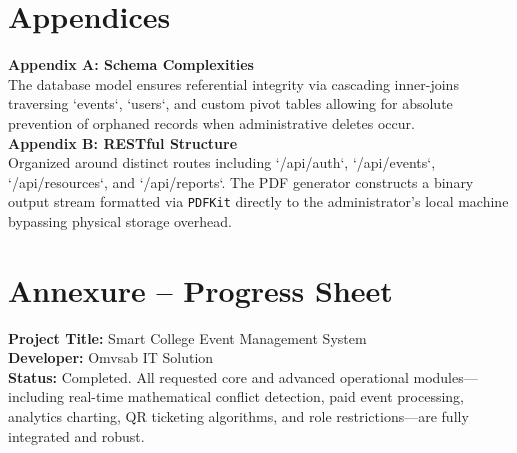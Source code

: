 \documentclass[12pt, a4paper]{report}
\begin{document}
\chapter{Appendices}
\noindent
\textbf{Appendix A: Schema Complexities} \\
The database model ensures referential integrity via cascading inner-joins traversing `events`, `users`, and custom pivot tables allowing for absolute prevention of orphaned records when administrative deletes occur.\\

\vspace{0.5cm}
\noindent
\textbf{Appendix B: RESTful Structure} \\
Organized around distinct routes including `/api/auth`, `/api/events`, `/api/resources`, and `/api/reports`. The PDF generator constructs a binary output stream formatted via \texttt{PDFKit} directly to the administrator's local machine bypassing physical storage overhead.

\chapter{Annexure – Progress Sheet}
\textbf{Project Title:} Smart College Event Management System \\
\textbf{Developer:} Omvsab IT Solution \\
\textbf{Status:} Completed. All requested core and advanced operational modules—including real-time mathematical conflict detection, paid event processing, analytics charting, QR ticketing algorithms, and role restrictions—are fully integrated and robust.
\end{document}
